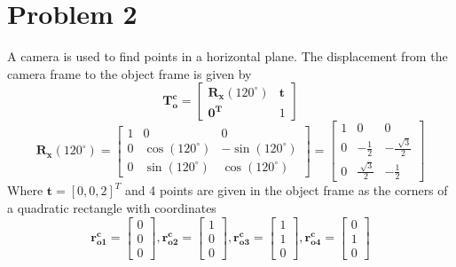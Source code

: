 \documentclass[12pt, letterpaper]{article}
\begin{document}
\section*{\large Problem 2}
A camera is used to find points in a horizontal plane. The displacement from
the camera frame to the object frame is given by
\begin{equation*}
    \bm{T^{c}_o}=\begin{bmatrix}
        \bm{R_x}(120^\circ) & \bm{t}\\
        \bm{0^{T}} & 1
    \end{bmatrix}
\end{equation*}
\begin{equation*}
    \bm{R_x}(120^\circ)=
    \begin{bmatrix}
        1 & 0 & 0 \\
        0 & \cos(120^\circ) & -\sin(120^\circ) \\
        0 & \sin(120^\circ) & \cos(120^\circ)
    \end{bmatrix}=
    \begin{bmatrix}
        1 & 0 & 0 \\
        0 & -\frac{1}{2} & -\frac{\sqrt[]{3}}{2} \\
        0 & \frac{\sqrt[]{3}}{2} & -\frac{1}{2}
    \end{bmatrix}
\end{equation*}
Where $\bm{t}=[0,0,2]^T$ and 4 points are given in the object frame as the corners of a 
quadratic rectangle with coordinates 
\begin{equation*}
    \bm{r_{o1}^c}=
    \begin{bmatrix}
        0\\
        0\\
        0
    \end{bmatrix},
    \bm{r_{o2}^c}=
    \begin{bmatrix}
        1\\
        0\\
        0
    \end{bmatrix},
    \bm{r_{o3}^c}=
    \begin{bmatrix}
        1\\
        1\\
        0
    \end{bmatrix},
    \bm{r_{o4}^c}=
    \begin{bmatrix}
        0\\
        1\\
        0
    \end{bmatrix}
\end{equation*}
\end{document}
